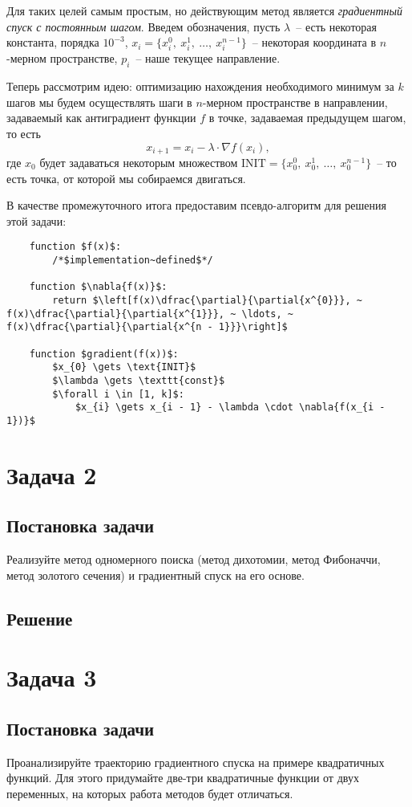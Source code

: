 \documentclass[12pt, a4paper, oneside]{article}
\begin{document}
	Для таких целей самым простым, но действующим метод является \textit{градиентный спуск с постоянным шагом}. 	Введем обозначения, пусть $\lambda$~-- есть некоторая константа, порядка $10^{-3}$, $x_{i} = \{x^{0}_{i}, ~ x^{1}_{i}, ~ \ldots, ~ x^{n - 1}_{i}\}$~-- некоторая координата в $n$-мерном пространстве, $p_{i}$~-- наше текущее направление.

	Теперь рассмотрим идею: оптимизацию нахождения необходимого минимум за $k$ шагов мы будем осуществлять шаги в $n$-мерном пространстве в направлении, задаваемый как антиградиент функции $f$ в точке, задаваемая предыдущем шагом, то есть
	\[
		x_{i + 1} = x_{i} - \lambda \cdot \nabla{f(x_{i})},
	\] где $x_{0}$ будет задаваться некоторым множеством $\text{INIT} = \{x^{0}_{0}, ~ x^{1}_{0}, ~ \ldots, ~ x^{n - 1}_{0}\}$~-- то есть точка, от которой мы собираемся двигаться.

	В качестве промежуточного итога предоставим псевдо-алгоритм для решения этой задачи:
	\begin{lstlisting}
	function $f(x)$:
		/*$implementation~defined$*/
			
	function $\nabla{f(x)}$:
		return $\left[f(x)\dfrac{\partial}{\partial{x^{0}}}, ~ f(x)\dfrac{\partial}{\partial{x^{1}}}, ~ \ldots, ~ f(x)\dfrac{\partial}{\partial{x^{n - 1}}}\right]$
			
	function $gradient(f(x))$:
		$x_{0} \gets \text{INIT}$
		$\lambda \gets \texttt{const}$
		$\forall i \in [1, k]$:
		    $x_{i} \gets x_{i - 1} - \lambda \cdot \nabla{f(x_{i - 1})}$
	\end{lstlisting}
	\section*{Задача 2}
	\subsection*{Постановка задачи}
	Реализуйте метод одномерного поиска (метод дихотомии, метод Фибоначчи, метод золотого сечения) и градиентный спуск на его основе.
	\subsection*{Решение}
	\section*{Задача 3}
	\subsection*{Постановка задачи}
	Проанализируйте траекторию градиентного спуска на примере квадратичных функций. Для этого придумайте две-три квадратичные функции от двух переменных, на которых работа методов будет отличаться.
\end{document}
